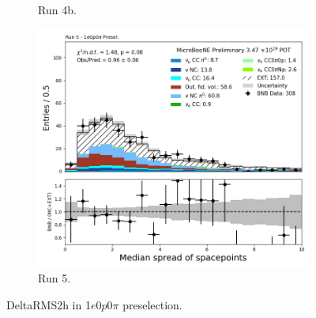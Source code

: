 \begin{figure}[H]
\begin{subfigure}[t]{0.32\linewidth}
        \caption{Run 4b.}
    \end{subfigure}%
    \hspace{0.2cm}%
    \begin{subfigure}[t]{0.32\linewidth}
        \includegraphics[width=\linewidth]{technote/Appendix_Preselection/Figures/1e0p0pi/Run5/DeltaRMS2h_Run5_1e0p0pi_Presel.png}
        \caption{Run 5.}
    \end{subfigure}
    \caption{DeltaRMS2h in 1$e$0$p$0$\pi$ preselection.}
\end{figure}


